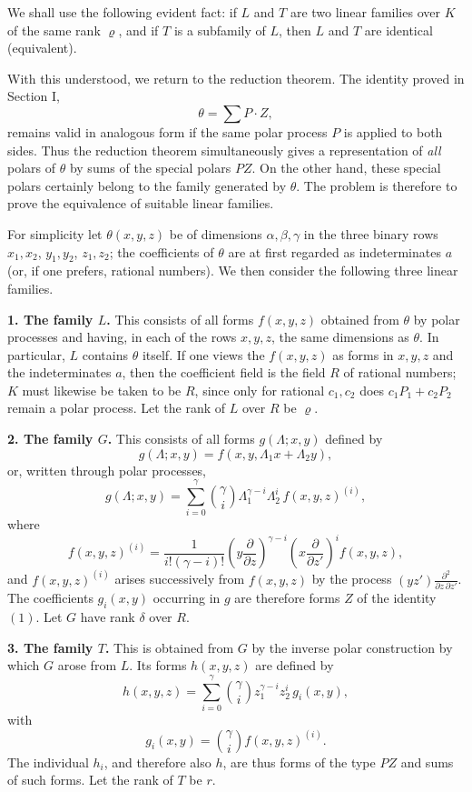 \documentclass[11pt]{article}
\begin{document}
We shall use the following evident fact: if \(L\) and \(T\) are two linear families over \(K\) of the same rank \(\varrho\), and if \(T\) is a subfamily of \(L\), then \(L\) and \(T\) are identical (equivalent).

With this understood, we return to the reduction theorem. The identity proved in Section I,
\[
\theta=\sum P\cdot Z,
\tag{1}
\]
remains valid in analogous form if the same polar process \(P\) is applied to both sides. Thus the reduction theorem simultaneously gives a representation of \emph{all} polars of \(\theta\) by sums of the special polars \(PZ\). On the other hand, these special polars certainly belong to the family generated by \(\theta\). The problem is therefore to prove the equivalence of suitable linear families.

For simplicity let \(\theta(x,y,z)\) be of dimensions \(\alpha,\beta,\gamma\) in the three binary rows \(x_1,x_2\), \(y_1,y_2\), \(z_1,z_2\); the coefficients of \(\theta\) are at first regarded as indeterminates \(a\) (or, if one prefers, rational numbers). We then consider the following three linear families.

\medskip
\noindent\textbf{1. The family \(L\).}
This consists of all forms \(f(x,y,z)\) obtained from \(\theta\) by polar processes and having, in each of the rows \(x,y,z\), the same dimensions as \(\theta\). In particular, \(L\) contains \(\theta\) itself. If one views the \(f(x,y,z)\) as forms in \(x,y,z\) and the indeterminates \(a\), then the coefficient field is the field \(R\) of rational numbers; \(K\) must likewise be taken to be \(R\), since only for rational \(c_1,c_2\) does \(c_1P_1+c_2P_2\) remain a polar process. Let the rank of \(L\) over \(R\) be \(\varrho\).

\medskip
\noindent\textbf{2. The family \(G\).}
This consists of all forms \(g(\Lambda;x,y)\) defined by
\[
g(\Lambda;x,y)=f(x,y,\Lambda_1x+\Lambda_2y),
\]
or, written through polar processes,
\[
g(\Lambda;x,y)=\sum_{i=0}^{\gamma}\binom{\gamma}{i}\Lambda_1^{\gamma-i}\Lambda_2^i\, f(x,y,z)^{(i)},
\]
where
\[
f(x,y,z)^{(i)}=
\frac{1}{i!(\gamma-i)!}
\left(y\frac{\partial}{\partial z}\right)^{\gamma-i}
\left(x\frac{\partial}{\partial z'}\right)^i
f(x,y,z),
\]
and \(f(x,y,z)^{(i)}\) arises successively from \(f(x,y,z)\) by the process \((yz')\frac{\partial^2}{\partial z\,\partial z'}\).
The coefficients \(g_i(x,y)\) occurring in \(g\) are therefore forms \(Z\) of the identity \((1)\). Let \(G\) have rank \(\delta\) over \(R\).

\medskip
\noindent\textbf{3. The family \(T\).}
This is obtained from \(G\) by the inverse polar construction by which \(G\) arose from \(L\). Its forms \(h(x,y,z)\) are defined by
\[
h(x,y,z)=\sum_{i=0}^{\gamma}\binom{\gamma}{i}z_1^{\gamma-i}z_2^i\, g_i(x,y),
\]
with
\[
g_i(x,y)=\binom{\gamma}{i}f(x,y,z)^{(i)}.
\]
The individual \(h_i\), and therefore also \(h\), are thus forms of the type \(PZ\) and sums of such forms. Let the rank of \(T\) be \(r\).
\end{document}
